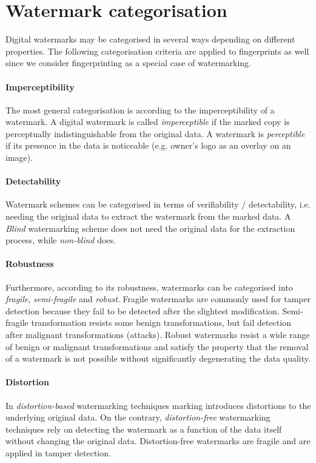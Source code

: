 \section{Watermark categorisation}

Digital watermarks may be categorised in several ways depending on different properties. 
The following categorisation criteria are applied to fingerprints as well since we consider fingerprinting as a special case of watermarking. 

\paragraph{Imperceptibility}
The most general categorisation is according to the imperceptibility of a watermark. A digital watermark is called \textit{imperceptible} if the marked copy is perceptually indistinguishable from the original data. 
A watermark is \textit{perceptible} if its presence in the data is noticeable (e.g. owner's logo as an overlay on an image).

\paragraph{Detectability}
Watermark schemes can be categorised in terms of verifiability / detectability, i.e. needing the original data to extract the watermark from the marked data. A \textit{Blind} watermarking scheme does not need the original data for the extraction process, while \textit{non-blind} does. 

\paragraph{Robustness}
Furthermore, according to its robustness, watermarks can be categorised into \textit{fragile}, \textit{semi-fragile} and \textit{robust}.  
Fragile watermarks are commonly used for tamper detection because they fail to be detected after the slightest modification. 
Semi-fragile transformation resists some benign transformations, but fail detection after malignant transformations (attacks). 
Robust watermarks resist a wide range of benign or malignant transformations and satisfy the property that the removal of a watermark is not possible without significantly degenerating the data quality.

\paragraph{Distortion}
In \textit{distortion-based} watermarking techniques marking introduces distortions to the underlying original data. 
On the contrary, \textit{distortion-free} watermarking techniques rely on detecting the watermark as a function of the data itself without changing the original data. 
Distortion-free watermarks are fragile and are applied in tamper detection.

